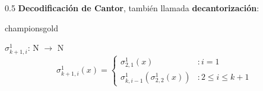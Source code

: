 \documentclass[xcolor=table]{beamer}
\begin{document}
\begin{frame}[fragile]
\begin{columns}
\begin{column}{0.5\textwidth}
    \textbf{Decodificación de Cantor}, también llamada \textbf{decantorización}:

         \begin{colorblock}[black]{championsgold}{}\scriptsize

         $\sigma^1_{k+1,i}$: N $\rightarrow$ N\\
        \[\sigma^1_{k+1,i}(x) = \left\{ \begin{array}{lr} \sigma^1_{2,1}(x) & : i=1\\ \sigma^1_{k,i-1}(\sigma^1_{2,2}(x)) & : 2 \leq i \leq k+1   \end{array} \right. \]


        \end{colorblock}
        
    \end{column}
    
\end{columns}


 \end{frame}
\end{document}
